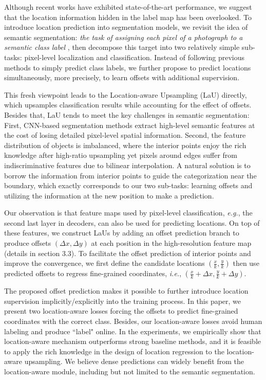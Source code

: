 \documentclass[10pt,twocolumn,letterpaper]{article}
\begin{document}
Although recent works have exhibited state-of-the-art performance, we suggest that the location information hidden in the label map has been overlooked. To introduce location prediction into segmentation models, we
revisit the idea of semantic segmentation: \textit{the task of assigning each pixel of a photograph to a semantic class label} \cite{LempitskyVZ11}, then decompose this target into two relatively simple sub-tasks: pixel-level localization and classification. Instead of following previous methods to simply predict class labels, we further propose to predict locations simultaneously, more precisely, to learn offsets with additional supervision. 

This fresh viewpoint leads to the Location-aware Upsampling (LaU) directly, which upsamples classification results while accounting for the effect of offsets. Besides that, LaU tends to meet the key challenges in semantic segmentation: First, CNN-based segmentation methods extract high-level semantic features at the cost of losing detailed pixel-level spatial information. Second, the feature distribution of objects is imbalanced, where the interior points enjoy the rich knowledge after high-ratio upsampling yet pixels around edges suffer from indiscriminative features due to bilinear interpolation. A natural solution is to borrow the information from interior points to guide the categorization near the boundary, which exactly corresponds to our two sub-tasks: learning offsets and utilizing the information at the new position to make a prediction.

Our observation is that feature maps used by pixel-level classification, \textit{e.g.}, the second last layer in decoders, can also be used for predicting locations. On top of these features, we construct LaUs by adding an offset prediction branch to produce offsets $(\Delta x,\Delta y)$ at each position in the high-resolution feature map (details in section 3.3). To facilitate the offset prediction of interior points and improve the convergence, we first define the candidate locations $(\frac{x}{k},\frac{y}{k})$ then use predicted offsets to regress fine-grained coordinates, \textit{i.e.}, $(\frac{x}{k}+\Delta x,\frac{y}{k}+\Delta y)$. 

The proposed offset prediction makes it possible to further introduce location supervision implicitly/explicitly into the training process. In this paper, we present two location-aware losses forcing the offsets to predict fine-grained coordinates with the correct class. Besides, our location-aware losses avoid human labeling and produce ``label" online. In the experiments, we empirically show that location-aware mechanism outperforms strong baseline methods, and it is feasible to apply the rich knowledge in the design of location regression to the location-aware upsampling. We believe dense predictions can widely benefit from the location-aware module, including but not limited to the semantic segmentation.
\end{document}

